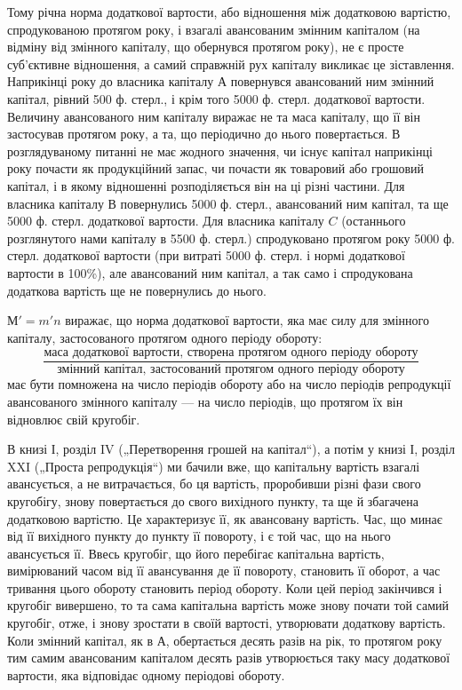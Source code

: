 Тому річна норма додаткової вартости, або відношення між додатковою
вартістю, спродукованою протягом року, і взагалі авансованим
змінним капіталом (на відміну від змінного капіталу, що обернувся
протягом року), не є просте суб’єктивне відношення, а самий
справжній рух капіталу викликає це зіставлення. Наприкінці року до
власника капіталу $А$ повернувся авансований ним змінний капітал, рівний
500 ф. стерл., і крім того 5000 ф. стерл. додаткової вартости. Величину
авансованого ним капіталу виражає не та маса капіталу, що її він застосував
протягом року, а та, що періодично до нього повертається. В
розглядуваному питанні не має жодного значення, чи існує капітал наприкінці
року почасти як продукційний запас, чи почасти як товаровий
або грошовий капітал, і в якому відношенні розподіляється він на ці
різні частини. Для власника капіталу В повернулись 5000 ф. стерл., авансований
ним капітал, та ще 5000 ф. стерл. додаткової вартости. Для власника
капіталу $C$ (останнього розглянутого нами капіталу в 5500 ф. стерл.)
спродуковано протягом року 5000 ф. стерл. додаткової вартости (при витраті
5000 ф. стерл. і нормі додаткової вартости в 100\%), але авансований
ним капітал, а так само і спродукована додаткова вартість ще не повернулись
до нього.

$М' = m'n$ виражає, що норма додаткової вартости, яка має силу
для змінного капіталу, застосованого протягом одного періоду обороту:\[
\frac{\text{маса додаткової вартости, створена протягом одного періоду обороту}}{\text{змінний капітал, застосований протягом одного періоду обороту}}
\]
має бути помножена на число періодів обороту або на число періодів
репродукції авансованого змінного капіталу — на число періодів, що протягом
їх він відновлює свій кругобіг.

В книзі І, розділ IV („Перетворення грошей на капітал“), а потім у
книзі І, розділ XXI („Проста репродукція“) ми бачили вже, що капітальну
вартість взагалі авансується, а не витрачається, бо ця вартість,
проробивши різні фази свого кругобігу, знову повертається до свого
вихідного пункту, та ще й збагачена додатковою вартістю. Це характеризує
її, як авансовану вартість. Час, що минає від її вихідного пункту
до пункту її повороту, і є той час, що на нього авансується її. Ввесь
кругобіг, що його перебігає капітальна вартість, вимірюваний часом від її
авансування де її повороту, становить її оборот, а час тривання цього обороту
становить період обороту. Коли цей період закінчився і кругобіг
вивершено, то та сама капітальна вартість може знову почати той самий
кругобіг, отже, і знову зростати в своїй вартості, утворювати додаткову
вартість. Коли змінний капітал, як в $А$, обертається десять разів на рік,
то протягом року тим самим авансованим капіталом десять разів утворюється
таку масу додаткової вартости, яка відповідає одному періодові
обороту.

